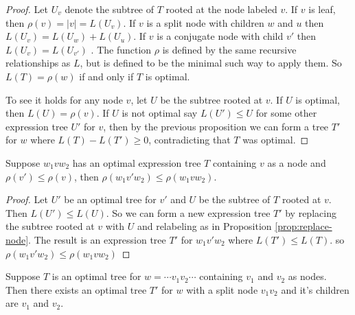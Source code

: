 \documentclass[12pt]{thesis}
\begin{document}
\begin{proof}
    Let $U_{v}$ denote
    the subtree of $T$ rooted at the node labeled $v$.
    If $v$ is leaf,
    then $\rho(v) = |v| = L(U_{v})$.
    If $v$ is a split node with children $w$ and $u$
    then $L(U_{v}) = L(U_{w}) + L(U_{u})$.
    If $v$ is a conjugate node with child $v'$
    then $L(U_{v}) = L(U_{v'})$ .
    The function $\rho$ is defined by the same recursive
    relationships as $L$, but is defined to be the minimal
    such way to apply them.
    So $L(T) = \rho(w)$ if and only if $T$ is optimal.

    To see it holds for any node $v$,
    let $U$ be the subtree rooted at $v$.
    If $U$ is optimal, then $L(U) = \rho(v)$.
    If $U$ is not optimal say $L(U') \leq U$ for some other expression tree $U'$ for $v$, then by the previous proposition
    we can form a tree $T'$ for $w$ where $L(T) - L(T')  \geq 0$,
    contradicting that $T$ was optimal.
\end{proof}

\begin{corollary}
    \label{cor:tree-substitution}
    Suppose $w_{1}vw_{2}$ has an optimal expression
    tree $T$ containing $v$ as a node
    and $\rho(v') \leq \rho(v)$,
    then $\rho(w_{1}v'w_{2}) \leq \rho(w_{1}vw_{2})$.
\end{corollary}

\begin{proof}
    Let $U'$ be an optimal tree for $v'$
    and $U$ be the subtree of $T$ rooted at $v$.
    Then $L(U') \leq L(U)$.
    So we can form a new expression
    tree $T'$ by replacing 
    the subtree rooted at $v$
    with $U$ and relabeling as in Proposition \ref{prop:replace-node}.
    The result is an expression tree $T'$ for $w_{1}v'w_{2}$
    where $L(T') \leq L(T)$.
    so $\rho(w_{1}v'w_{2}) \leq \rho(w_{1}vw_{2})$
\end{proof}

\begin{proposition}
    \label{prop:reorder-tree}
    Suppose $T$ is an optimal tree for
    $w = \cdots v_{1}v_{2} \cdots$
    containing $v_{1}$ and $v_{2}$ as nodes.
    Then there exists an optimal tree $T'$
    for $w$ with a split node $v_{1}v_{2}$
    and it's children are $v_{1}$ and $v_{2}$.
\end{proposition}
\end{document}
